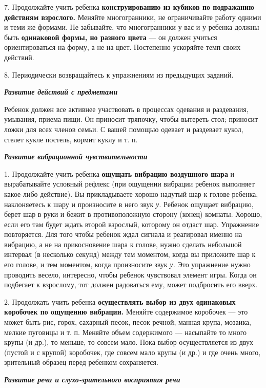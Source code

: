\documentclass[a5paper]{book}
\renewcommand{\emph}[1]{\textit{#1}}
\begin{document}
7. Продолжайте учить ребенка \textbf{конструированию из кубиков по
подражанию действиям взрослого.} Меняйте многогранники, не ограничивайте
работу одними и теми же формами. Не забывайте, что многогранники у вас и
у ребенка должны быть \textbf{одинаковой формы, но разного цвета} --- он
должен учиться ориентироваться на форму, а не на цвет. Постепенно
ускоряйте темп своих действий.

8. Периодически возвращайтесь к упражнениям из предыдущих заданий.

\emph{\textbf{Развитие действий с предметами}}

Ребенок должен все активнее участвовать в процессах одевания и
раздевания, умывания, приема пищи. Он приносит тряпочку, чтобы вытереть
стол; приносит ложки для всех членов семьи. С вашей помощью одевает и
раздевает кукол, стелет кукле постель, кормит куклу и т. п.

\emph{\textbf{Развитие вибрационной чувствительности}}

1. Продолжайте учить ребенка \textbf{ощущать вибрацию воздушного шара} и
вырабатывайте условный рефлекс (при ощущении вибрации ребенок выполняет
какое-либо действие). Вы прикладываете хорошо надутый шар к голове
ребенка, наклоняетесь к шару и произносите в него звук \emph{у.} Ребенок
ощущает вибрацию, берет шар в руки и бежит в противоположную сторону
(конец) комнаты. Хорошо, если его там будет ждать второй взрослый,
которому он отдаст шар. Упражнение повторяется. Для того чтобы ребенок
ждал сигнала и реагировал именно на вибрацию, а не на прикосновение шара
к голове, нужно сделать небольшой интервал (в несколько секунд) между
тем моментом, когда вы приложите шар к его голове, и тем моментом, когда
произносите звук \emph{у.} Это упражнение нужно проводить весело,
интересно, чтобы ребенок чувствовал элемент игры. Когда он подбегает к
взрослому, тот должен радоваться ему, может подбросить его вверх.

2. Продолжать учить ребенка \textbf{осуществлять выбор из двух
одинаковых коробочек по ощущению вибрации.} Меняйте содержимое коробочек
--- это может быть рис, горох, сахарный песок, песок речной, манная
крупа, мозаика, мелкие пуговицы и т. п. Меняйте объем содержимого ---
насыпайте то много крупы (и др.), то меньше, то совсем мало. Пока выбор
осуществляется из двух (пустой и с крупой) коробочек, где совсем мало
крупы (и др.) и где очень много, зрительный образец перед ребенком
сохраняется.

\emph{\textbf{Развитие речи и слухо-зрительного восприятия речи}}
\end{document}
